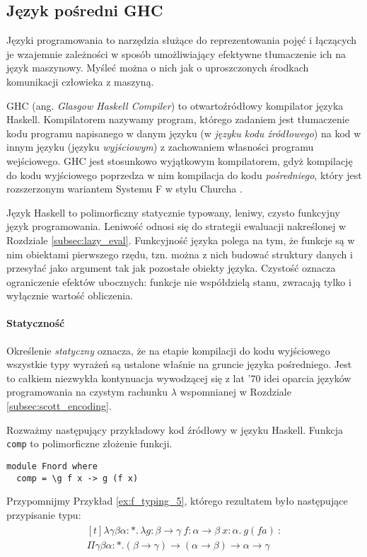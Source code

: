 \subsection{Język pośredni GHC}

Języki programowania to narzędzia służące do reprezentowania pojęć i łączących je wzajemnie zależności w sposób umożliwiający efektywne tłumaczenie ich na język maszynowy. Myśleć można o nich jak o uproszczonych środkach komunikacji człowieka z maszyną.

GHC (ang. \emph{Glasgow Haskell Compiler}) to otwartoźródłowy kompilator języka Haskell. Kompilatorem nazywamy program, którego zadaniem jest tłumaczenie kodu programu napisanego w danym języku (w \emph{języku kodu źródłowego}) na kod w innym języku (języku \emph{wyjściowym}) z zachowaniem własności programu wejściowego. GHC jest stosunkowo wyjątkowym kompilatorem, gdyż kompilację do kodu wyjściowego poprzedza w nim kompilacja do kodu \emph{pośredniego}, który jest rozszerzonym wariantem Systemu F w stylu Churcha \cite{Sulzmann2007}. 

Język Haskell to polimorficzny statycznie typowany, leniwy, czysto funkcyjny język programowania. Leniwość odnosi się do strategii ewaluacji nakreślonej w Rozdziale \ref{subsec:lazy_eval}. Funkcyjność języka polega na tym, że funkcje są w nim obiektami pierwszego rzędu, tzn. można z nich budować struktury danych i przesyłać jako argument tak jak pozostałe obiekty języka. Czystość oznacza ograniczenie efektów ubocznych: funkcje nie współdzielą stanu, zwracają tylko i wyłącznie wartość obliczenia. 

\paragraph{Statyczność}
Określenie \emph{statyczny} oznacza, że na etapie kompilacji do kodu wyjściowego wszystkie typy wyrażeń są ustalone właśnie na gruncie języka pośredniego. Jest to całkiem niezwykła kontynuacja wywodzącej się z lat '70 idei oparcia języków programowania na czystym rachunku \(\lambda\) wspomnianej w Rozdziale \ref{subsec:scott_encoding}.

Rozważmy następujący przykładowy kod źródłowy w języku Haskell. Funkcja \texttt{comp} to polimorficzne złożenie funkcji.

\begin{verbatim}
module Fnord where
  comp = \g f x -> g (f x)
\end{verbatim}

Przypomnijmy Przykład \ref{ex:f_typing_5}, którego rezultatem było następujące przypisanie typu:
\begin{align}
  \begin{aligned}[t]
\lambda \gamma \beta \alpha:*.\,\lambda g: \beta \to \gamma\  f:\alpha\to\beta\ x:\alpha.\ g(f a)\ :\\
\Pi\gamma\beta\alpha:*.(\beta\to\gamma)\to(\alpha\to\beta)\to\alpha\to\gamma
  \end{aligned}\tag{\(\blacklozenge\)}\label{ex:typing_compar}
\end{align}

